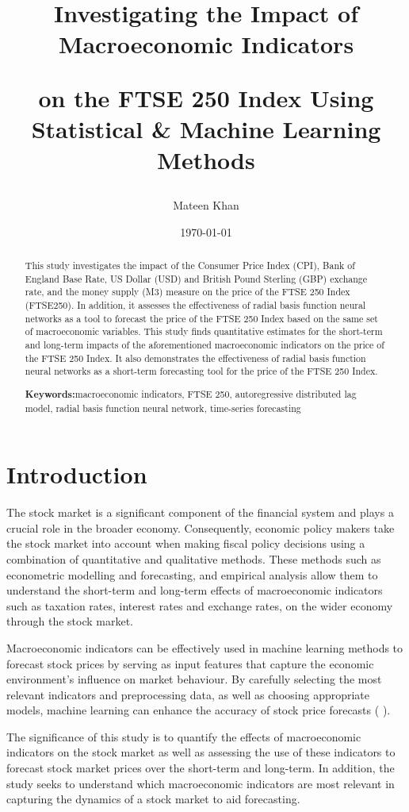 \documentclass[11pt,a4paper]{article}
\title{Investigating the Impact of Macroeconomic Indicators

on the FTSE 250 Index Using Statistical \& Machine Learning Methods}
\author{Mateen Khan}
\date{\today}
\providecommand{\keywordname}{\textbf{Keywords:}} %
\newcommand{\keywords}[1]{%
  \par\addvspace{\baselineskip}%
  \noindent\keywordname\enspace\ignorespaces#1 %
}
\newcommand{\citeboth}[1]{\citeauthor{#1} \citep{#1}}
\begin{document}
\maketitle

\begin{abstract}
    This study investigates the impact of the Consumer Price Index (CPI), Bank of England Base Rate, US Dollar (USD) and British Pound Sterling (GBP) exchange rate, and the money supply (M3) measure on the price of the FTSE 250 Index (FTSE250).
    In addition, it assesses the effectiveness of radial basis function neural networks as a tool to forecast the price of the FTSE 250 Index based on the same set of macroeconomic variables. This study finds quantitative estimates for the short-term and long-term impacts of the aforementioned macroeconomic indicators on the price of the FTSE 250 Index. It also demonstrates the effectiveness of radial basis function neural networks as a short-term forecasting tool for the price of the FTSE 250 Index.
    \keywords{macroeconomic indicators, FTSE 250, autoregressive distributed lag model, radial basis function neural network, time-series forecasting}
\end{abstract}

\section{Introduction}

The stock market is a significant component of the financial system and 
plays a crucial role in the broader economy. Consequently, economic policy 
makers take the stock market into account when making fiscal policy 
decisions using a combination of quantitative and qualitative methods. 
These methods such as econometric modelling and forecasting, and empirical 
analysis allow them to understand the short-term and long-term effects of 
macroeconomic indicators such as taxation rates, interest rates and exchange rates,
on the wider economy through the stock market.

Macroeconomic indicators can be effectively used in machine learning 
methods to forecast stock prices by serving as input features that capture 
the economic environment’s influence on market behaviour. By carefully 
selecting the most relevant indicators and preprocessing data, 
as well as choosing appropriate models, machine learning can enhance the accuracy of stock price forecasts (\citeboth{Sarma2023,Prasad2023}).

The significance of this study is to quantify the effects of macroeconomic indicators on the stock market as well as assessing the use of these indicators to forecast stock market prices over the short-term and long-term. In addition, the study seeks to understand which macroeconomic indicators are most relevant in capturing the dynamics of a stock market to aid forecasting.
\end{document}
